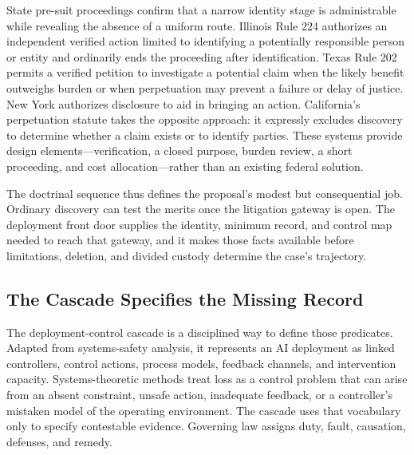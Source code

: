 State pre-suit proceedings confirm that a narrow identity stage is administrable while revealing the absence of a uniform route. Illinois Rule 224 authorizes an independent verified action limited to identifying a potentially responsible person or entity and ordinarily ends the proceeding after identification. Texas Rule 202 permits a verified petition to investigate a potential claim when the likely benefit outweighs burden or when perpetuation may prevent a failure or delay of justice. New York authorizes disclosure to aid in bringing an action. California's perpetuation statute takes the opposite approach: it expressly excludes discovery to determine whether a claim exists or to identify parties. These systems provide design elements---verification, a closed purpose, burden review, a short proceeding, and cost allocation---rather than an existing federal solution.

The doctrinal sequence thus defines the proposal's modest but consequential job. Ordinary discovery can test the merits once the litigation gateway is open. The deployment front door supplies the identity, minimum record, and control map needed to reach that gateway, and it makes those facts available before limitations, deletion, and divided custody determine the case's trajectory.

\subsection{The Cascade Specifies the Missing Record}
\label{sec:cascade}

The deployment-control cascade is a disciplined way to define those predicates. Adapted from systems-safety analysis, it represents an AI deployment as linked controllers, control actions, process models, feedback channels, and intervention capacity. Systems-theoretic methods treat loss as a control problem that can arise from an absent constraint, unsafe action, inadequate feedback, or a controller's mistaken model of the operating environment. The cascade uses that vocabulary only to specify contestable evidence. Governing law assigns duty, fault, causation, defenses, and remedy.

